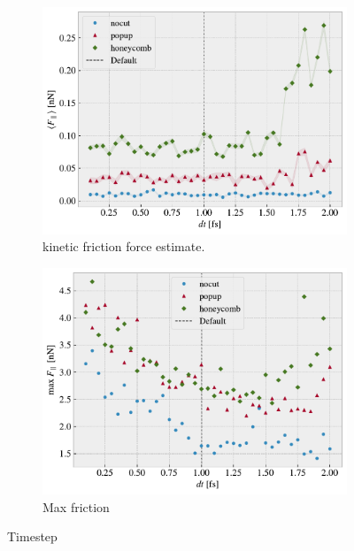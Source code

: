 \begin{figure}[H]
  \centering
  \begin{subfigure}[t]{0.49\textwidth}
      \centering
      \includegraphics[width=\textwidth]{figures/baseline/variables_dt_mean_fixmove.pdf}
      \caption{kinetic friction force estimate.}
      \label{fig:var_dt_mean}
  \end{subfigure}
  \hfill
  \begin{subfigure}[t]{0.49\textwidth}
      \centering
      \includegraphics[width=\textwidth]{figures/baseline/variables_dt_max_fixmove.pdf}
      \caption{Max friction}
      \label{fig:var_dt_max}
  \end{subfigure}
  \hfill
     \caption{Timestep}
     \label{fig:var_dt}
\end{figure}


